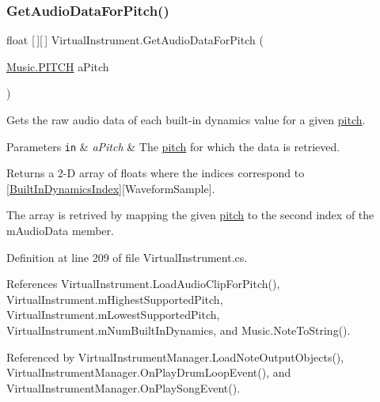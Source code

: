 \subsubsection{\texorpdfstring{Get\+Audio\+Data\+For\+Pitch()}{GetAudioDataForPitch()}}
{\footnotesize\ttfamily float \mbox{[}$\,$\mbox{]}\mbox{[}$\,$\mbox{]} Virtual\+Instrument.\+Get\+Audio\+Data\+For\+Pitch (\begin{DoxyParamCaption}\item[{\hyperlink{group___music_enums_ga508f69b199ea518f935486c990edac1d}{Music.\+P\+I\+T\+CH}}]{a\+Pitch }\end{DoxyParamCaption})}



Gets the raw audio data of each built-\/in dynamics value for a given \hyperlink{group___music_enums_ga508f69b199ea518f935486c990edac1d}{pitch}. 


\begin{DoxyParams}[1]{Parameters}
\mbox{\tt in}  & {\em a\+Pitch} & The \hyperlink{group___music_enums_ga508f69b199ea518f935486c990edac1d}{pitch} for which the data is retrieved. \\
\hline
\end{DoxyParams}
\begin{DoxyReturn}{Returns}
a 2-\/D array of floats where the indices correspond to \mbox{[}\hyperlink{group___audio_DefBID}{Built\+In\+Dynamics\+Index}\mbox{]}\mbox{[}Waveform\+Sample\mbox{]}.
\end{DoxyReturn}
The array is retrived by mapping the given \hyperlink{group___music_enums_ga508f69b199ea518f935486c990edac1d}{pitch} to the second index of the m\+Audio\+Data member. 

Definition at line 209 of file Virtual\+Instrument.\+cs.



References Virtual\+Instrument.\+Load\+Audio\+Clip\+For\+Pitch(), Virtual\+Instrument.\+m\+Highest\+Supported\+Pitch, Virtual\+Instrument.\+m\+Lowest\+Supported\+Pitch, Virtual\+Instrument.\+m\+Num\+Built\+In\+Dynamics, and Music.\+Note\+To\+String().



Referenced by Virtual\+Instrument\+Manager.\+Load\+Note\+Output\+Objects(), Virtual\+Instrument\+Manager.\+On\+Play\+Drum\+Loop\+Event(), and Virtual\+Instrument\+Manager.\+On\+Play\+Song\+Event().


